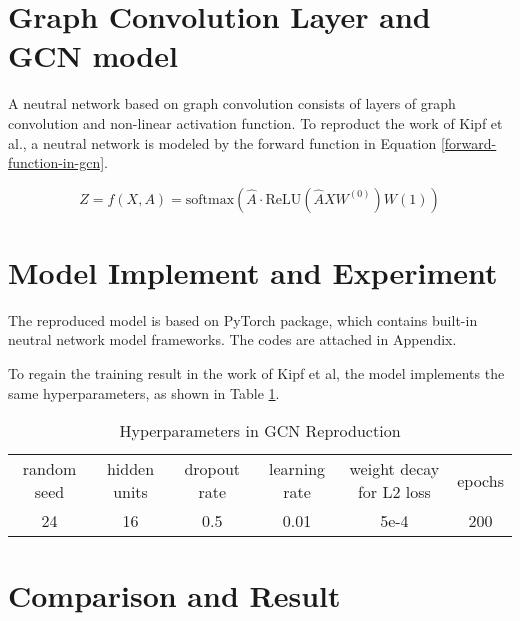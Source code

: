 
\section{Graph Convolution Layer and GCN model}

A neutral network based on graph convolution consists of layers of graph convolution and non-linear activation function. To reproduct the work of Kipf et al.\cite{DBLP:journals/corr/KipfW16}, a neutral network is modeled by the forward function in Equation \ref{forward-function-in-gcn}.

\begin{equation}
    Z = f(X, A) = \text{softmax} \left(\hat{A}\cdot \text{ReLU}\left(\hat{A}XW^{(0)}\right)W(1)\right)
    \label{forward-function-in-gcn}
\end{equation}

\section{Model Implement and Experiment}

The reproduced model is based on PyTorch package, which contains built-in neutral network model frameworks. The codes are attached in Appendix. 

To regain the training result in the work of Kipf et al\cite{DBLP:journals/corr/KipfW16}, the model implements the same hyperparameters, as shown in Table \ref{hyperparam-gcn}.

\medskip

\begin{table}[H]
    \centering
    \small
    \begin{tabular}{cccccc}
        \hline
        random seed & hidden units & dropout rate & learning rate & weight decay for L2 loss & epochs \\
        24 & 16 & 0.5 & 0.01 & 5e-4 & 200 \\
        \hline
    \end{tabular}
    \caption{Hyperparameters in GCN Reproduction}
    \label{hyperparam-gcn}
\end{table}

\section{Comparison and Result}

